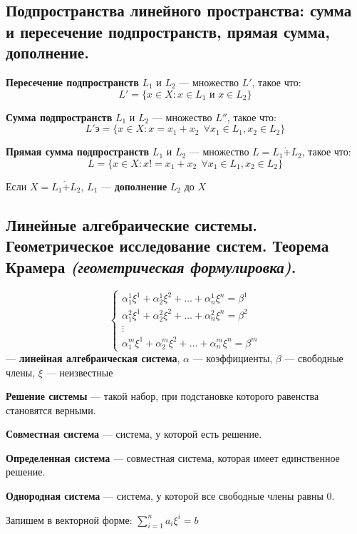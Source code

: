 \subsection{Подпространства линейного пространства: сумма и пересечение подпространств, прямая сумма, дополнение.}
\begin{definition}
    \textbf{Пересечение подпространств} $L_1$ и $L_2$ --- множество $L'$, такое что: $$L'=\{x\in X : x\in L_1 \text{ и } x\in L_2\}$$
\end{definition}
\begin{definition}
    \textbf{Сумма подпространств} $L_1$ и $L_2$ --- множество $L''$, такое что: $$L'э=\{x\in X : x=x_1+x_2 \ \ \forall x_1 \in L_1, x_2 \in L_2\}$$
\end{definition}
\begin{definition}
    \textbf{Прямая сумма подпространств} $L_1$ и $L_2$ --- множество $L=L_1\dot+L_2$, такое что: $$L=\{x\in X : x!=x_1+x_2 \ \ \forall x_1 \in L_1, x_2 \in L_2\}$$
\end{definition}
\begin{definition}
    Если $X=L_1\dot+L_2$, $L_1$ --- \textbf{дополнение} $L_2$ до $X$
\end{definition}
\subsection{Линейные алгебраические системы. Геометрическое исследование систем. Теорема Крамера \textit{(геометрическая формулировка)}.}
\begin{definition}
    $$\begin{cases}
            \alpha_1^1\xi^1+\alpha_2^1\xi^2+\ldots+\alpha_n^1\xi^n=\beta^1 \\
            \alpha_1^2\xi^1+\alpha_2^2\xi^2+\ldots+\alpha_n^2\xi^n=\beta^2 \\
            \vdots                                                         \\
            \alpha_1^m\xi^1+\alpha_2^m\xi^2+\ldots+\alpha_n^m\xi^n=\beta^m
        \end{cases}$$ --- \textbf{линейная алгебраическая система}, $\alpha$ --- коэффициенты, $\beta$ --- свободные члены, $\xi$ --- неизвестные
\end{definition}
\begin{definition}
    \textbf{Решение системы} --- такой набор, при подстановке которого равенства становятся верными.
\end{definition}
\begin{definition}
    \textbf{Совместная система} --- система, у которой есть решение.
\end{definition}
\begin{definition}
    \textbf{Определенная система} --- совместная система, которая имеет единственное решение.
\end{definition}
\begin{definition}
    \textbf{Однородная система} --- система, у которой все свободные члены равны $0$.
\end{definition}
Запишем в векторной форме: $\sum\limits_{i=1}^n a_i\xi^i=b$

